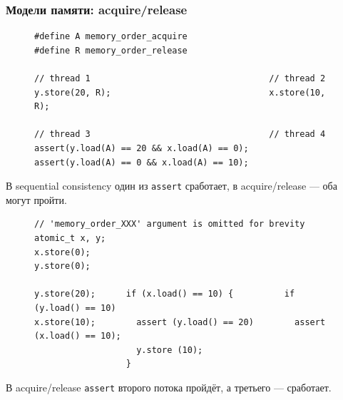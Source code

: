 \documentclass[aspectratio=169, pdf, 8pt, unicode]{beamer}
\begin{document}
\begin{frame}[fragile]
\frametitle{Модели памяти: acquire/release}
\begin{figure}[H]
\begin{BVerbatim}
#define A memory_order_acquire
#define R memory_order_release

// thread 1                                   // thread 2
y.store(20, R);                               x.store(10, R);

// thread 3                                   // thread 4
assert(y.load(A) == 20 && x.load(A) == 0);    assert(y.load(A) == 0 && x.load(A) == 10); 
\end{BVerbatim}
\end{figure}

В sequential consistency один из \texttt{assert} сработает, в acquire/release --- оба могут пройти.

\begin{figure}[H]
\begin{BVerbatim}
// 'memory_order_XXX' argument is omitted for brevity
atomic_t x, y;
x.store(0);
y.store(0);

y.store(20);      if (x.load() == 10) {          if (y.load() == 10)
x.store(10);        assert (y.load() == 20)        assert (x.load() == 10);
                    y.store (10);
                  }
\end{BVerbatim}
\end{figure}

В acquire/release \texttt{assert} второго потока пройдёт, а третьего --- сработает.

\end{frame}
\end{document}
